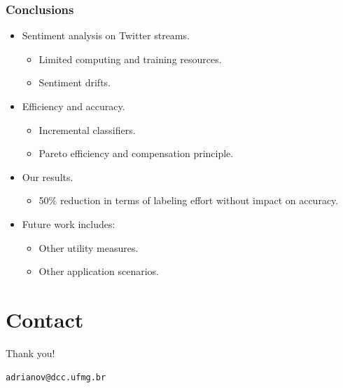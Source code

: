 \documentclass[14pt]{beamer}
\begin{document}
\begin{frame}\frametitle{Conclusions}

\begin{itemize}
\item Sentiment analysis on Twitter streams.
\begin{itemize}
\item Limited computing and training resources.
\item Sentiment drifts.
\end{itemize}
\item Efficiency and accuracy.
\begin{itemize}
\item Incremental classifiers.
\item Pareto efficiency and compensation principle.
\end{itemize}
\item Our results.
\begin{itemize}
\item 50\% reduction in terms of labeling effort without impact on accuracy.
\end{itemize}
\item Future work includes:
\begin{itemize}
\item Other utility measures.
\item Other application scenarios.
\end{itemize}
\end{itemize}

\end{frame}

\section{Contact}
\begin{frame}{Thank you!}
\begin{center}
\tt adrianov@dcc.ufmg.br\\
\end{center}
\end{frame}
\end{document}
